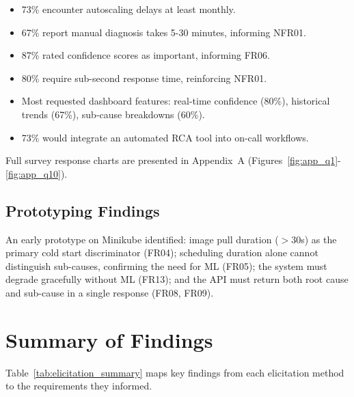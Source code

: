 \begin{itemize}
    \item 73\% encounter autoscaling delays at least monthly.
    \item 67\% report manual diagnosis takes 5-30 minutes, informing NFR01.
    \item 87\% rated confidence scores as important, informing FR06.
    \item 80\% require sub-second response time, reinforcing NFR01.
    \item Most requested dashboard features: real-time confidence (80\%), historical trends (67\%), sub-cause breakdowns (60\%).
    \item 73\% would integrate an automated RCA tool into on-call workflows.
\end{itemize}

Full survey response charts are presented in Appendix~A (Figures~\ref{fig:app_q1}-\ref{fig:app_q10}).

\subsection{Prototyping Findings}
An early prototype on Minikube identified: image pull duration ($>$30s) as the primary cold start discriminator (FR04); scheduling duration alone cannot distinguish sub-causes, confirming the need for ML (FR05); the system must degrade gracefully without ML (FR13); and the API must return both root cause and sub-cause in a single response (FR08, FR09).

\section{Summary of Findings}
Table~\ref{tab:elicitation_summary} maps key findings from each elicitation method to the requirements they informed.

